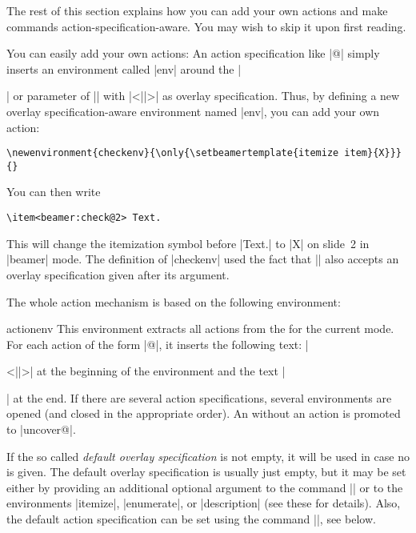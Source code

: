 \begin{original...}
The rest of this section explains how you can add your own actions and make commands action-specification-aware. You may wish to skip it upon first reading.

You can easily add your own actions: An action specification like |@| simply inserts an environment called |env| around the |\item| or parameter of |\action| with |<||>| as overlay specification. Thus, by defining a new overlay specification-aware environment named |env|, you can add your own action:
\begin{verbatim}
\newenvironment{checkenv}{\only{\setbeamertemplate{itemize item}{X}}}{}
\end{verbatim}

You can then write
\begin{verbatim}
\item<beamer:check@2> Text.
\end{verbatim}

This will change the itemization symbol before |Text.| to |X| on slide~2 in |beamer| mode. The definition of |checkenv| used the fact that |\only| also accepts an overlay specification given after its argument.

The whole action mechanism is based on the following environment:

\begin{environment}{{actionenv}}
  This environment extracts all actions from the  for the current mode. For each action of the form |@|, it inserts the following text: |\begin{|\meta{action}|env}<||>| at the beginning of the environment and the text |\end{|\meta{action}|env}| at the end. If there are several action specifications, several environments are opened (and closed in the appropriate order). An  without an action is promoted to |uncover@|.

  If the so called \emph{default overlay specification} is not empty, it will be used in case no  is given. The default overlay specification is usually just empty, but it may be set either by providing an additional optional argument to the command |\frame| or to the environments |itemize|, |enumerate|, or |description| (see these for details). Also, the default action specification can be set using the command |\beamerdefaultoverlayspecification|, see below.


\end{environment}
\end{original...}
